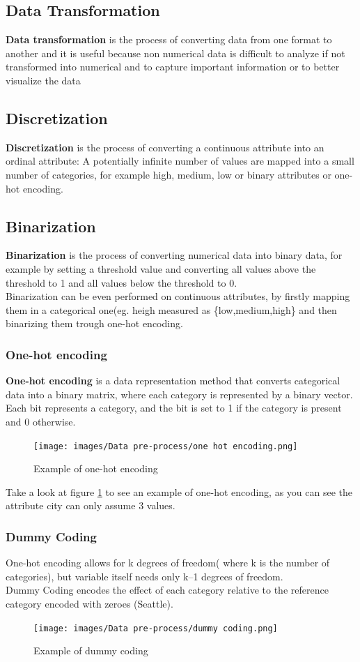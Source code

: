 \subsection{Data Transformation}
\textbf{Data transformation} is the process of converting data from
one format to another and it is useful because non numerical data is
difficult to analyze if not transformed into numerical and to capture
important information or to better visualize the data

\subsection{Discretization}
\textbf{Discretization }is the process of converting a continuous
attribute into an ordinal attribute: A potentially infinite number of
values are mapped into a small number of categories, for example
{high, medium, low} or binary attributes or one-hot encoding. 

\subsection{Binarization}
\textbf{Binarization} is the process of converting numerical data into 
binary data, for example by setting a threshold value and converting 
all values above the threshold to 1 and all values below the threshold 
to 0.\\
Binarization can be even performed on continuous attributes, by
firstly mapping them in a categorical one(eg. heigh measured as
\{low,medium,high\} and then binarizing them trough one-hot encoding.
\subsubsection{One-hot encoding}
\textbf{One-hot encoding} is a data representation method that
converts categorical data into a binary matrix, where each category
is represented by a binary vector.\\
Each bit represents a category, and the bit is set to 1 if the 
category is present and 0 otherwise.
\begin{figure}[h]
  \centering
  \texttt{[image: images/Data
  pre-process/one hot encoding.png]}
  \caption{Example of one-hot encoding}
  \label{fig:one-hot-encoding}
\end{figure}
Take a look at figure \ref{fig:one-hot-encoding} to see an example of 
one-hot encoding, as you can see the attribute city can only assume 3
values.

\subsubsection{Dummy Coding}
One-hot encoding allows for k degrees of freedom( where k is the
number of categories), but variable itself needs only k–1 degrees of 
freedom.\\
Dummy Coding encodes the effect of each category relative to the
reference category encoded with zeroes (Seattle).
\begin{figure}[H]
  \centering
  \texttt{[image: images/Data
  pre-process/dummy coding.png]}
  \caption{Example of dummy coding}
  \label{fig:dummy-coding}
\end{figure}

